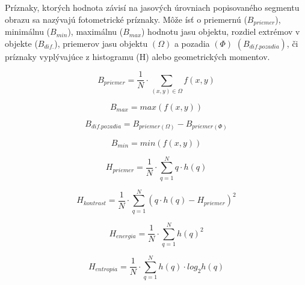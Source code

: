         Príznaky, ktorých hodnota závisí na jasových úrovniach popisovaného segmentu obrazu sa nazývajú fotometrické príznaky. Môže ísť o priemernú ($B_{priemer}$), minimálnu ($B_{min}$), maximálnu ($B_{max}$) hodnotu jasu objektu, rozdiel extrémov v objekte ($B_{dif.}$), priemerov jasu objektu $(\Omega)$ a pozadia $(\Phi)$ $(B_{dif. pozadia})$, či príznaky vyplývajúce z histogramu (H) alebo geometrických momentov.

        \begin{figure}[!ht]
            \centering
            \begin{minipage}[b]{0.45\textwidth}
                \[
                    B_{priemer} = \frac{1}{N} \cdot \sum_{(x,y) \in \Omega} f(x,y)
                \]
            \end{minipage}
            \begin{minipage}[b]{0.45\textwidth}
                \begin{equation}
                    B_{max} = max(f(x,y))
                \end{equation}
            \end{minipage}
            \begin{minipage}[b]{0.45\textwidth}
                \[
                    B_{dif. pozadia} = B_{priemer(\Omega)} - B_{priemer(\Phi)} 
                \]
            \end{minipage}
            \begin{minipage}[b]{0.45\textwidth}
                \[
                    B_{min} = min(f(x,y))
                \]
            \end{minipage}
            \begin{minipage}[b]{0.45\textwidth}
                \[
                    H_{priemer} = \frac{1}{N} \cdot \sum_{q=1}^{N} q \cdot h(q)
                \]
            \end{minipage}
            \begin{minipage}[b]{0.5\textwidth}
                \[
                    H_{kontrast} = \frac{1}{N} \cdot \sum_{q=1}^{N} (q \cdot h(q) - H_{priemer})^2
                \]
            \end{minipage}
            \begin{minipage}[b]{0.45\textwidth}
                \[
                    H_{energia} = \frac{1}{N} \cdot \sum_{q=1}^{N} h(q)^2
                \]
            \end{minipage}
            \begin{minipage}[b]{0.45\textwidth}
                \[
                    H_{entropia} = \frac{1}{N} \cdot \sum_{q=1}^{N} h(q) \cdot log_2h(q)
                \]
            \end{minipage}
        \end{figure}

